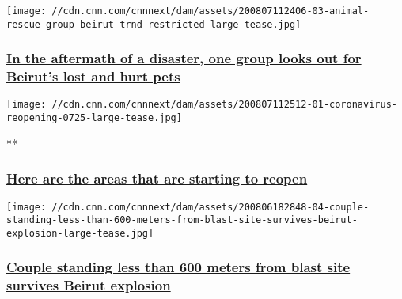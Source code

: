 \texttt{[image: //cdn.cnn.com/cnnnext/dam/assets/200807112406-03-animal-rescue-group-beirut-trnd-restricted-large-tease.jpg]}

\hypertarget{in-the-aftermath-of-a-disaster-one-group-looks-out-for-beiruts-lost-and-hurt-pets}{%
\subsubsection{\texorpdfstring{\href{/2020/08/07/world/beirut-animal-rescue-reuniting-pets-trnd/index.html}{In
the aftermath of a disaster, one group looks out for Beirut's lost and
hurt
pets}}{In the aftermath of a disaster, one group looks out for Beirut's lost and hurt pets}}\label{in-the-aftermath-of-a-disaster-one-group-looks-out-for-beiruts-lost-and-hurt-pets}}

\href{/2020/04/24/world/gallery/coronavirus-after-lockdown/index.html}{}

\texttt{[image: //cdn.cnn.com/cnnnext/dam/assets/200807112512-01-coronavirus-reopening-0725-large-tease.jpg]}

**

\hypertarget{here-are-the-areas-that-are-starting-to-reopen}{%
\subsubsection{\texorpdfstring{\href{/2020/04/24/world/gallery/coronavirus-after-lockdown/index.html}{Here
are the areas that are starting to
reopen}}{Here are the areas that are starting to reopen}}\label{here-are-the-areas-that-are-starting-to-reopen}}

\href{/2020/08/06/world/beirut-explosion-survivors-trnd/index.html}{}

\texttt{[image: //cdn.cnn.com/cnnnext/dam/assets/200806182848-04-couple-standing-less-than-600-meters-from-blast-site-survives-beirut-explosion-large-tease.jpg]}

\hypertarget{couple-standing-less-than-600-meters-from-blast-site-survives-beirut-explosion}{%
\subsubsection{\texorpdfstring{\href{/2020/08/06/world/beirut-explosion-survivors-trnd/index.html}{Couple
standing less than 600 meters from blast site survives Beirut
explosion}}{Couple standing less than 600 meters from blast site survives Beirut explosion}}\label{couple-standing-less-than-600-meters-from-blast-site-survives-beirut-explosion}}

